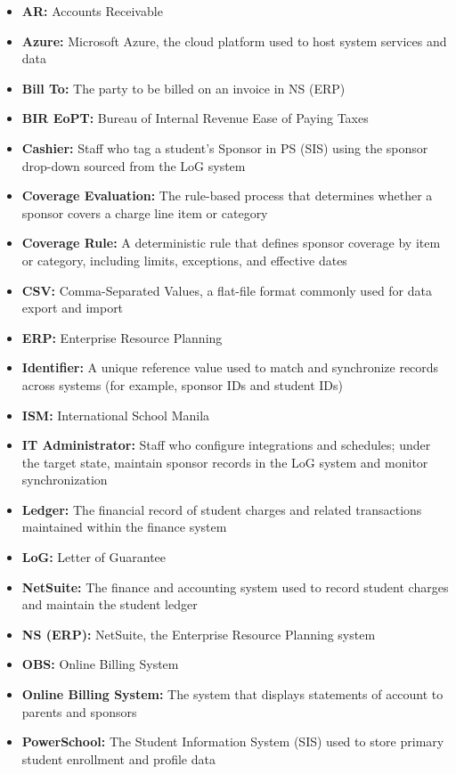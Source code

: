 \documentclass[12pt,a4paper]{article}
\begin{document}
\begin{itemize}
  \item \textbf{AR:} Accounts Receivable
  \item \textbf{Azure:} Microsoft Azure, the cloud platform used to host system services and data
  \item \textbf{Bill To:} The party to be billed on an invoice in NS (ERP)
  \item \textbf{BIR EoPT:} Bureau of Internal Revenue Ease of Paying Taxes
  \item \textbf{Cashier:} Staff who tag a student’s Sponsor in PS (SIS) using the sponsor drop-down sourced from the LoG system
  \item \textbf{Coverage Evaluation:} The rule-based process that determines whether a sponsor covers a charge line item or category
  \item \textbf{Coverage Rule:} A deterministic rule that defines sponsor coverage by item or category, including limits, exceptions, and effective dates
  \item \textbf{CSV:} Comma-Separated Values, a flat-file format commonly used for data export and import
  \item \textbf{ERP:} Enterprise Resource Planning
  \item \textbf{Identifier:} A unique reference value used to match and synchronize records across systems (for example, sponsor IDs and student IDs)
  \item \textbf{ISM:} International School Manila
  \item \textbf{IT Administrator:} Staff who configure integrations and schedules; under the target state, maintain sponsor records in the LoG system and monitor synchronization
  \item \textbf{Ledger:} The financial record of student charges and related transactions maintained within the finance system
  \item \textbf{LoG:} Letter of Guarantee
  \item \textbf{NetSuite:} The finance and accounting system used to record student charges and maintain the student ledger
  \item \textbf{NS (ERP):} NetSuite, the Enterprise Resource Planning system
  \item \textbf{OBS:} Online Billing System
  \item \textbf{Online Billing System:} The system that displays statements of account to parents and sponsors
  \item \textbf{PowerSchool:} The Student Information System (SIS) used to store primary student enrollment and profile data

\end{itemize}
\end{document}
